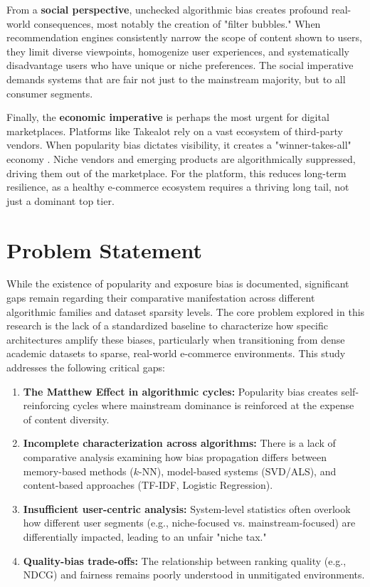 \documentclass[11pt,a4paper]{report}
\begin{document}
From a \textbf{social perspective}, unchecked algorithmic bias creates profound real-world consequences, most notably the creation of "filter bubbles." When recommendation engines consistently narrow the scope of content shown to users, they limit diverse viewpoints, homogenize user experiences, and systematically disadvantage users who have unique or niche preferences. The social imperative demands systems that are fair not just to the mainstream majority, but to all consumer segments.

Finally, the \textbf{economic imperative} is perhaps the most urgent for digital marketplaces. Platforms like Takealot rely on a vast ecosystem of third-party vendors. When popularity bias dictates visibility, it creates a "winner-takes-all" economy \citep{anderson2004long}. Niche vendors and emerging products are algorithmically suppressed, driving them out of the marketplace. For the platform, this reduces long-term resilience, as a healthy e-commerce ecosystem requires a thriving long tail, not just a dominant top tier.

\section{Problem Statement}
While the existence of popularity and exposure bias is documented, significant gaps remain regarding their comparative manifestation across different algorithmic families and dataset sparsity levels. The core problem explored in this research is the lack of a standardized baseline to characterize how specific architectures amplify these biases, particularly when transitioning from dense academic datasets to sparse, real-world e-commerce environments. This study addresses the following critical gaps:

\begin{enumerate}
    \item \textbf{The Matthew Effect in algorithmic cycles:} Popularity bias creates self-reinforcing cycles where mainstream dominance is reinforced at the expense of content diversity.
    \item \textbf{Incomplete characterization across algorithms:} There is a lack of comparative analysis examining how bias propagation differs between memory-based methods ($k$-NN), model-based systems (SVD/ALS), and content-based approaches (TF-IDF, Logistic Regression).
    \item \textbf{Insufficient user-centric analysis:} System-level statistics often overlook how different user segments (e.g., niche-focused vs. mainstream-focused) are differentially impacted, leading to an unfair "niche tax."
    \item \textbf{Quality-bias trade-offs:} The relationship between ranking quality (e.g., NDCG) and fairness remains poorly understood in unmitigated environments.
\end{enumerate}
\end{document}
